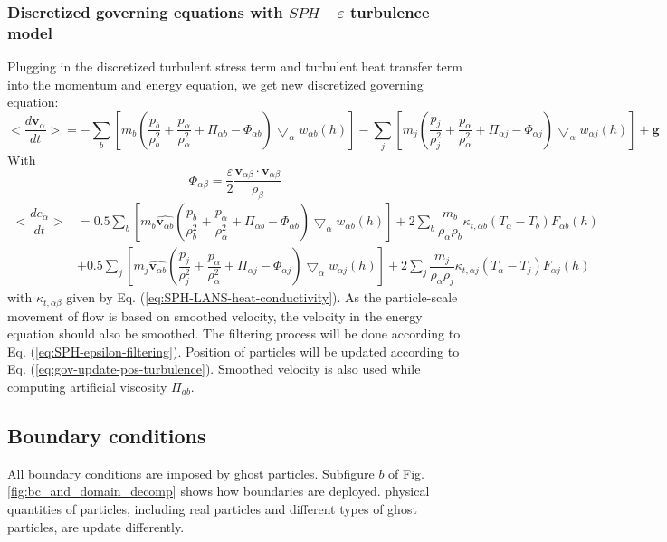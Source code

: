 \documentclass[journal abbreviation, manuscript]{copernicus}
\begin{document}
\subsubsection{Discretized governing equations with $SPH-\varepsilon$ turbulence model}
Plugging in the discretized turbulent stress term and turbulent heat transfer term into the momentum and energy equation, we get new discretized governing equation:
\begin{equation}
<\dfrac{d \textbf{v}_{\alpha}}{d t}>= 
-\sum_b [m_b (\dfrac{p_b}{\rho_b^2} + \dfrac{p_{\alpha}}{\rho_{\alpha}^2} + \Pi_{\alpha b} - \Phi_{\alpha b}) \bigtriangledown_{\alpha}w_{\alpha b}(h)]
-\sum_j [m_j (\dfrac{p_j}{\rho_j^2} + \dfrac{p_{\alpha}}{\rho_{\alpha}^2} + \Pi_{\alpha j} - \Phi_{\alpha j}) \bigtriangledown_{\alpha}w_{\alpha j}(h)]
+\textbf{g} \label{eq:gov-sph-v}
\end{equation}
With 
\begin{equation}
\Phi_{\alpha \beta}=\dfrac{\varepsilon}{2} \dfrac{\textbf{v}_{\alpha \beta} \cdot \textbf{v}_{\alpha \beta}} {\rho_{\beta}} 
\end{equation}
\begin{equation}
\begin{split}
<\dfrac{d e_{\alpha}}{d t}>
& = 0.5\sum_b [m_b \widehat{\textbf{v}_{\alpha b}} (\dfrac{p_b}{\rho_b^2} + \dfrac{p_{\alpha}}{\rho_{\alpha}^2} + \Pi_{\alpha b} - \Phi_{\alpha b}) \bigtriangledown_{\alpha}w_{\alpha b}(h)] 
 + 2 \sum_b \dfrac{m_b}{\rho_{\alpha} \rho_b} \kappa_{t,\alpha b} (T_{\alpha} - T_b) F_{\alpha b} (h) \\
 & +0.5\sum_j [m_j \widehat{\textbf{v}_{\alpha b}}(\dfrac{p_j}{\rho_j^2} + \dfrac{p_{\alpha}}{\rho_{\alpha}^2} + \Pi_{\alpha j} - \Phi_{\alpha j}) \bigtriangledown_{\alpha}w_{\alpha j}(h)]
 + 2 \sum_j \dfrac{m_j}{\rho_{\alpha} \rho_j} \kappa_{t,\alpha j} (T_{\alpha} - T_j) F_{\alpha j} (h)
\end{split}
\label{eq:gov-sph-e}
\end{equation}
with $\kappa_{t,\alpha \beta}$ given by Eq. (\ref{eq:SPH-LANS-heat-conductivity}). 
As the particle-scale movement of flow is based on smoothed velocity, the velocity in the energy equation should also be smoothed.
The filtering process will be done according to Eq. (\ref{eq:SPH-epsilon-filtering}). Position of particles will be updated according to Eq. (\ref{eq:gov-update-pos-turbulence}). Smoothed velocity is also used while computing artificial viscosity $\Pi_{ab}$.

\subsection{Boundary conditions}
All boundary conditions are imposed by ghost particles. Subfigure $b$ of Fig. \ref{fig:bc_and_domain_decomp} shows how boundaries are deployed. physical quantities of particles, including real particles and different types of ghost particles, are update differently.
\end{document}
